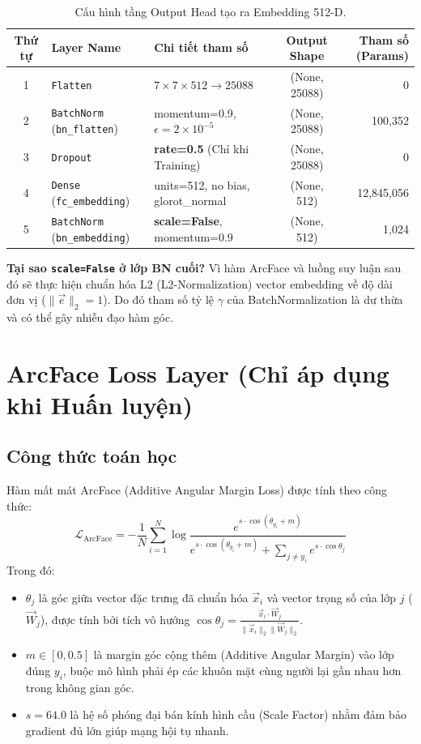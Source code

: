 \documentclass[11pt,a4paper]{article}
\begin{document}
\begin{table}[H]
\centering
\begin{tabular}{c l l c r}
\toprule
\textbf{Thứ tự} & \textbf{Layer Name} & \textbf{Chi tiết tham số} & \textbf{Output Shape} & \textbf{Tham số (Params)} \\
\midrule
1 & \texttt{Flatten} & $7 \times 7 \times 512 \to 25088$ & (None, 25088) & 0 \\
2 & \texttt{BatchNorm} (\texttt{bn\_flatten}) & momentum=0.9, $\epsilon=2\times10^{-5}$ & (None, 25088) & 100,352 \\
3 & \texttt{Dropout} & \textbf{rate=0.5} (Chỉ khi Training) & (None, 25088) & 0 \\
4 & \texttt{Dense} (\texttt{fc\_embedding}) & units=512, no bias, glorot\_normal & (None, 512) & 12,845,056 \\
5 & \texttt{BatchNorm} (\texttt{bn\_embedding}) & \textbf{scale=False}, momentum=0.9 & (None, 512) & 1,024 \\
\bottomrule
\end{tabular}
\caption{Cấu hình tầng Output Head tạo ra Embedding 512-D.}
\end{table}

\noindent \textbf{Tại sao \texttt{scale=False} ở lớp BN cuối?} Vì hàm ArcFace và luồng suy luận sau đó sẽ thực hiện chuẩn hóa L2 (L2-Normalization) vector embedding về độ dài đơn vị ($\|\vec{e}\|_2 = 1$). Do đó tham số tỷ lệ $\gamma$ của BatchNormalization là dư thừa và có thể gây nhiễu đạo hàm góc.

\section{ArcFace Loss Layer (Chỉ áp dụng khi Huấn luyện)}

\subsection{Công thức toán học}
Hàm mất mát ArcFace (Additive Angular Margin Loss) được tính theo công thức:
\begin{equation}
\mathcal{L}_{\text{ArcFace}} = -\frac{1}{N} \sum_{i=1}^{N} \log \frac{e^{s \cdot \cos(\theta_{y_i} + m)}}{e^{s \cdot \cos(\theta_{y_i} + m)} + \sum_{j \neq y_i} e^{s \cdot \cos\theta_{j}}}
\end{equation}
Trong đó:
\begin{itemize}
    \item $\theta_j$ là góc giữa vector đặc trưng đã chuẩn hóa $\vec{x}_i$ và vector trọng số của lớp $j$ ($\vec{W}_j$), được tính bởi tích vô hướng $\cos\theta_j = \frac{\vec{x}_i \cdot \vec{W}_j}{\|\vec{x}_i\|_2 \|\vec{W}_j\|_2}$.
    \item $m \in [0, 0.5]$ là margin góc cộng thêm (Additive Angular Margin) vào lớp đúng $y_i$, buộc mô hình phải ép các khuôn mặt cùng người lại gần nhau hơn trong không gian góc.
    \item $s = 64.0$ là hệ số phóng đại bán kính hình cầu (Scale Factor) nhằm đảm bảo gradient đủ lớn giúp mạng hội tụ nhanh.
\end{itemize}
\end{document}
